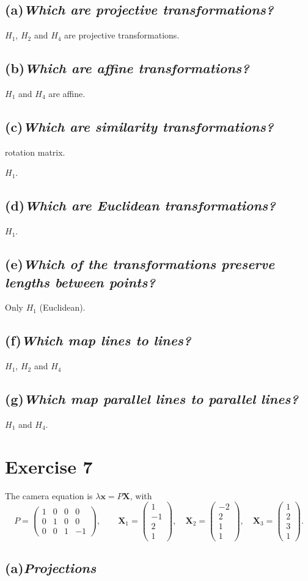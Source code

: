 \documentclass[11pt,a4paper]{article}
\newcommand{\vb}[1]{\mathbf{#1}}
\newcommand{\vect}[1]{
    \begin{pmatrix}#1
\end{pmatrix}}
\newcommand{\exercise}[1]{
\section*{Exercise #1}}
\newcommand{\task}[2]{
\subsection*{#1\quad\normalfont\textit{#2}}}
\begin{document}
\task{(a)}{Which are projective transformations?}

\begin{answer}
    $H_1$, $H_2$ and $H_4$ are projective transformations.
\end{answer}

\task{(b)}{Which are affine transformations?}

\begin{answer}
    $H_1$ and $H_4$ are affine.
\end{answer}

\task{(c)}{Which are similarity transformations?}

rotation matrix.
\begin{answer}
    $H_1$.
\end{answer}

\task{(d)}{Which are Euclidean transformations?}
\begin{answer}
    $H_1$.
\end{answer}

\task{(e)}{Which of the transformations preserve lengths between points?}
\begin{answer}
    Only $H_1$ (Euclidean).
\end{answer}

\task{(f)}{Which map lines to lines?}
\begin{answer}
    $H_1$, $H_2$ and $H_4$
\end{answer}

\task{(g)}{Which map parallel lines to parallel lines?}
\begin{answer}
    $H_1$ and $H_4$.
\end{answer}

\exercise{7}

The camera equation is $\lambda\vb{x} = P\vb{X}$, with
\[
    P = \vect{1&0&0&0\\0&1&0&0\\0&0&1&-1},\qquad
    \vb{X}_1 = \vect{1\\-1\\2\\1},\quad
    \vb{X}_2 = \vect{-2\\2\\1\\1},\quad
    \vb{X}_3 = \vect{1\\2\\3\\1}.
\]

\task{(a)}{Projections}
\end{document}
